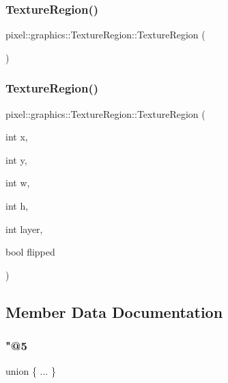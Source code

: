 \subsubsection{\texorpdfstring{Texture\+Region()}{TextureRegion()}\hspace{0.1cm}{\footnotesize\ttfamily [1/2]}}
{\footnotesize\ttfamily pixel\+::graphics\+::\+Texture\+Region\+::\+Texture\+Region (\begin{DoxyParamCaption}{ }\end{DoxyParamCaption})\hspace{0.3cm}{\ttfamily [default]}}

\mbox{\label{structpixel_1_1graphics_1_1_texture_region_acbd50d361f37be881ba6e445d6337a64}} 
\subsubsection{\texorpdfstring{Texture\+Region()}{TextureRegion()}\hspace{0.1cm}{\footnotesize\ttfamily [2/2]}}
{\footnotesize\ttfamily pixel\+::graphics\+::\+Texture\+Region\+::\+Texture\+Region (\begin{DoxyParamCaption}\item[{int}]{x,  }\item[{int}]{y,  }\item[{int}]{w,  }\item[{int}]{h,  }\item[{int}]{layer,  }\item[{bool}]{flipped }\end{DoxyParamCaption})\hspace{0.3cm}{\ttfamily [inline]}}



\subsection{Member Data Documentation}
\mbox{\label{structpixel_1_1graphics_1_1_texture_region_a508f16bd182c880989bdce2fe4ae2504}} 
\subsubsection{\texorpdfstring{"@5}{@5}}
{\footnotesize\ttfamily union \{ ... \} }

